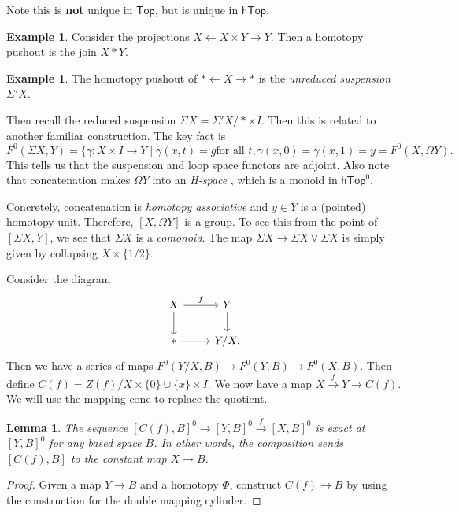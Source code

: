 \documentclass[leqno, openany]{memoir}
\newtheorem{lem}[thm]{Lemma}
\theoremstyle{definition}
\newtheorem{exm}[thm]{Example}
\theoremstyle{remark}
\theoremstyle{plain}
\theoremstyle{definition}
\theoremstyle{remark}
\newcommand{\ms}[1]{\mathsf{#1}}
\begin{document}
Note this is \textbf{not} unique in $\ms{Top}$, but is unique in $\ms{hTop}$.

\begin{exm}
    Consider the projections $X \gets X \times Y \to Y$. Then a homotopy pushout is the join $X * Y$.
\end{exm}

\begin{exm}
    The homotopy pushout of $* \gets X \to *$ is the \textit{unreduced suspension} $\Sigma' X$. 
\end{exm}

Then recall the reduced suspension $\Sigma X = \Sigma' X / * \times I$. Then this is related to another familiar construction. The key fact is
\[ F^0(\Sigma X, Y) = \{ \gamma: X \times I \to Y \mid \gamma(x,t) = g \text{for all $t$}, \gamma(x,0) = \gamma(x,1) = y = F^0(X, \Omega Y). \]
This tells us that the suspension and loop space functors are adjoint.
Also note that concatenation makes $\Omega Y$ into an \textit{H-space} , which is a monoid in $\ms{hTop}^0$. 

Concretely, concatenation is \textit{homotopy associative} and $y \in Y$ is a (pointed) homotopy unit. Therefore, $[X, \Omega Y]$ is a group. To see this from the point of $[\Sigma X, Y]$, we see that $\Sigma X$ is a \textit{comonoid}. The map $\Sigma X \to \Sigma X \vee \Sigma X$ is simply given by collapsing $X \times \{ 1/2 \}$.  

Consider the diagram
\begin{equation}
\begin{tikzcd}
    X \arrow{r}{f} \arrow{d} & Y \arrow{d} \\
    * \arrow{r} & Y/X.
\end{tikzcd}
\end{equation}
Then we have a series of maps $F^0(Y/X,B) \to F^0(Y,B) \to F^0(X,B)$. Then define $C(f) = Z(f) / X \times \{0 \} \cup \{x\} \times I$. We now have a map $X \xrightarrow{f} Y \to C(f)$. We will use the mapping cone to replace the quotient.

\begin{lem}
    The sequence $[C(f),B]^0 \to [Y,B]^0 \xrightarrow{f} [X,B]^0$ is exact at $[Y,B]^0$ for any based space $B$. In other words, the composition sends $[C(f),B]$ to the constant map $X \to B$.
\end{lem}

\begin{proof}
    Given a map $Y \to B$ and a homotopy $\Phi$, construct $C(f) \to B$ by using the construction for the double mapping cylinder.
\end{proof}
\end{document}
